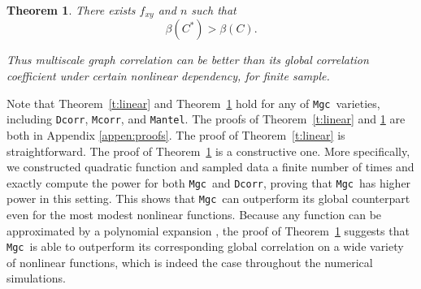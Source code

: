 \documentclass[11pt]{article}
\providecommand{\sct}[1]{{\sc \texttt{#1}}}
\newcommand{\G}{C}
\newcommand{\Mgc}{\sct{Mgc}}
\newcommand{\Dcorr}{\sct{Dcorr}}
\newcommand{\Mcorr}{\sct{Mcorr}}
\newcommand{\Mantel}{\sct{Mantel}}
\newtheorem{thm}{Theorem}
\begin{document}
\begin{thm}
\label{t:non}
There exists $f_{xy}$ and $n$ such that
\begin{equation}
\beta(\G^{*}) > \beta(\G).
\end{equation}

Thus multiscale graph correlation can be better than its global correlation coefficient under certain nonlinear dependency, for finite sample.
\end{thm}
Note that Theorem~\ref{t:linear} and Theorem~\ref{t:non} hold for any of \Mgc~varieties, including  \Dcorr, \Mcorr, and \Mantel.
%
The proofs of Theorem~\ref{t:linear} and \ref{t:non} are both in Appendix \ref{appen:proofs}.  The proof of Theorem~\ref{t:linear} is straightforward.  The proof of Theorem~\ref{t:non} is a constructive one. More specifically, we constructed quadratic function and sampled data a finite number of times and exactly compute the power for both \Mgc~and \Dcorr, proving that \Mgc~has higher power in this setting. This shows that \Mgc~can outperform its global counterpart even for the most modest nonlinear functions.  Because any function can be approximated by a polynomial expansion \cite{RudinBook}, the proof of Theorem~\ref{t:non} suggests that \Mgc~is able to outperform its corresponding global correlation on a wide variety of nonlinear functions, which is indeed the case throughout the numerical simulations.



\end{document}
